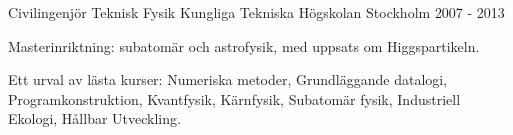 


\begin{cventries}




\cventry
{Civilingenjör Teknisk Fysik} %
{Kungliga Tekniska Högskolan} %
{Stockholm} %
{2007 - 2013} %
{ %
\begin{cvitems}
\item {Masterinriktning: subatomär och astrofysik, med uppsats om Higgspartikeln.}
\item {Ett urval av lästa kurser: Numeriska metoder, Grundläggande datalogi, Programkonstruktion, Kvantfysik, Kärnfysik, Subatomär fysik, Industriell Ekologi, Hållbar Utveckling.}
\end{cvitems}
}


\end{cventries}
